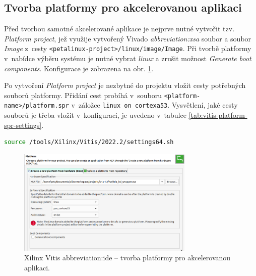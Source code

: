 \documentclass[a4paper, twoside, 11pt]{article}
\begin{document}
		\subsection{Tvorba platformy pro akcelerovanou aplikaci}
		Před tvorbou samotné akcelerované aplikace je nejprve nutné vytvořit tzv. \textit{Platform project}, jež využije vytvořený Vivado \textit{\gls{abbreviation:xsa}} soubor a soubor \textit{Image} z~cesty \texttt{<petalinux-project>/linux/image/Image}. Při tvorbě platformy v~nabídce výběru systému je nutné vybrat \textit{linux} a zrušit možnost \textit{Generate boot components}. Konfigurace je zobrazena na obr. \ref{fig:vitis-new-platform-linux}.\par
		Po vytvoření \textit{Platform project} je nezbytné do projektu vložit cesty potřebných souborů platformy. Přidání cest probíhá v~souboru \texttt{<platform-name>/platform.spr} v~záložce \texttt{linux on cortexa53}. Vysvětlení, jaké cesty souborů je třeba vložit v~konfiguraci, je uvedeno v~tabulce \ref{tab:vitis-platform-spr-settings}.\par
	

	\begin{lstlisting}[language={sh}, caption={Aktivace prostředí pro Vitis verze 2022.2.}, label= {lst:vitis-environment}, morekeywords={source}]
source /tools/Xilinx/Vitis/2022.2/settings64.sh\end{lstlisting}


		\begin{figure}[htbp!]
			\centering
			\includegraphics[width=0.75\textwidth]{src/png/vitis-new-platform-linux.png}
			\caption{Xilinx Vitis \gls{abbreviation:ide} – tvorba platformy pro akcelerovanou aplikaci.}
			\label{fig:vitis-new-platform-linux}
		\end{figure}
\end{document}
